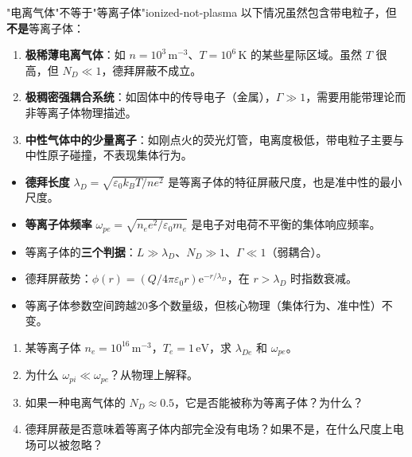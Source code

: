 \documentclass[12pt,a4paper,openany,oneside]{book}
\newcommand{\ee}{\mathrm{e}}
\newcommand{\eps}{\varepsilon}
\begin{document}
\begin{warning}{"电离气体"不等于"等离子体"}{ionized-not-plasma}
以下情况虽然包含带电粒子，但\textbf{不是}等离子体：
\begin{enumerate}
\item \textbf{极稀薄电离气体}：如 $n=10^3\,\mathrm{m}^{-3}$、$T=10^6\,\mathrm{K}$ 的某些星际区域。虽然 $T$ 很高，但 $N_D \ll 1$，德拜屏蔽不成立。
\item \textbf{极稠密强耦合系统}：如固体中的传导电子（金属），$\Gamma \gg 1$，需要用能带理论而非等离子体物理描述。
\item \textbf{中性气体中的少量离子}：如刚点火的荧光灯管，电离度极低，带电粒子主要与中性原子碰撞，不表现集体行为。
\end{enumerate}
\end{warning}

\begin{chapterreview}
\begin{itemize}
\item \textbf{德拜长度} $\lambda_D = \sqrt{\eps_0 k_BT/ne^2}$ 是等离子体的特征屏蔽尺度，也是准中性的最小尺度。
\item \textbf{等离子体频率} $\omega_{pe} = \sqrt{n_e e^2/\eps_0 m_e}$ 是电子对电荷不平衡的集体响应频率。
\item 等离子体的\textbf{三个判据}：$L \gg \lambda_D$、$N_D \gg 1$、$\Gamma \ll 1$（弱耦合）。
\item 德拜屏蔽势：$\phi(r) = (Q/4\pi\eps_0 r)\ee^{-r/\lambda_D}$，在 $r>\lambda_D$ 时指数衰减。
\item 等离子体参数空间跨越20多个数量级，但核心物理（集体行为、准中性）不变。
\end{itemize}
\end{chapterreview}

\begin{miniquiz}
\begin{enumerate}
\item 某等离子体 $n_e = 10^{16}\,\mathrm{m}^{-3}$，$T_e = 1\,\mathrm{eV}$，求 $\lambda_{De}$ 和 $\omega_{pe}$。
\item 为什么 $\omega_{pi} \ll \omega_{pe}$？从物理上解释。
\item 如果一种电离气体的 $N_D \approx 0.5$，它是否能被称为等离子体？为什么？
\item 德拜屏蔽是否意味着等离子体内部完全没有电场？如果不是，在什么尺度上电场可以被忽略？
\end{enumerate}
\end{miniquiz}


\end{document}
